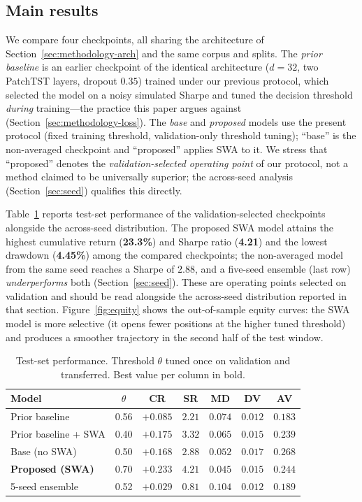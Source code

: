 \documentclass[runningheads]{llncs}
\begin{document}
\subsection{Main results}
We compare four checkpoints, all sharing the architecture of
Section~\ref{sec:methodology-arch} and the same corpus and splits. The
\emph{prior baseline} is an earlier checkpoint of the identical architecture
($d{=}32$, two PatchTST layers, dropout $0.35$) trained under our previous
protocol, which selected the model on a noisy simulated Sharpe and tuned the
decision threshold \emph{during} training---the practice this paper argues
against (Section~\ref{sec:methodology-loss}). The \emph{base} and \emph{proposed} models use the present
protocol (fixed training threshold, validation-only threshold tuning); ``base''
is the non-averaged checkpoint and ``proposed'' applies SWA to it. We stress that
``proposed'' denotes the \emph{validation-selected operating point} of our
protocol, not a method claimed to be universally superior; the across-seed analysis (Section~\ref{sec:seed}) qualifies this
directly.

Table~\ref{tab:main} reports test-set performance of the validation-selected
checkpoints alongside the across-seed distribution. The proposed SWA model attains the highest cumulative return
(\textbf{23.3\%}) and Sharpe ratio (\textbf{4.21}) and the lowest drawdown
(\textbf{4.45\%}) among the compared checkpoints; the non-averaged model from the
same seed reaches a Sharpe of $2.88$, and a five-seed ensemble (last row)
\emph{underperforms} both (Section~\ref{sec:seed}). These are operating points
selected on validation and should be read alongside the across-seed
distribution reported in that section. Figure~\ref{fig:equity}
shows the out-of-sample equity curves: the SWA model is more selective (it opens
fewer positions at the higher tuned threshold) and produces a smoother trajectory
in the second half of the test window.

\begin{table}[t]
\centering
\caption{Test-set performance. Threshold $\theta$ tuned once on validation and
transferred. Best value per column in bold.}
\label{tab:main}
\setlength{\tabcolsep}{5pt}
\begin{tabular}{lcccccc}
\toprule
Model & $\theta$ & CR & SR & MD & DV & AV \\
\midrule
Prior baseline             & 0.56 & $+0.085$ & $2.21$ & $0.074$ & $0.012$ & $0.183$ \\
Prior baseline + SWA       & 0.40 & $+0.175$ & $3.32$ & $0.065$ & $0.015$ & $0.239$ \\
Base (no SWA)              & 0.50 & $+0.168$ & $2.88$ & $0.052$ & $0.017$ & $0.268$ \\
\textbf{Proposed (SWA)}    & 0.70 & $\mathbf{+0.233}$ & $\mathbf{4.21}$ & $\mathbf{0.045}$ & $0.015$ & $0.244$ \\
\midrule
5-seed ensemble            & 0.52 & $+0.029$ & $0.81$ & $0.104$ & $0.012$ & $0.189$ \\
\bottomrule
\end{tabular}
\end{table}
\end{document}
